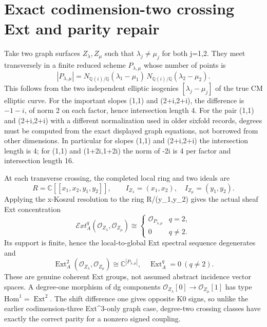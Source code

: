 \documentclass[11pt,a4paper]{article}
\newcommand{\Q}{\mathbb Q}
\newcommand{\Ext}{\operatorname{Ext}}
\begin{document}
\section{Exact codimension-two crossing Ext and parity repair}
Take two graph surfaces \(Z_\lambda,Z_\mu\) such that
\(\lambda_j\ne\mu_j\) for both j=1,2. They meet
transversely in a finite reduced scheme \(P_{\lambda,\mu}\)
whose number of points is
\[
 \boxed{|P_{\lambda,\mu}|=
  N_{\Q(i)/\Q}(\lambda_1-\mu_1)\,
  N_{\Q(i)/\Q}(\lambda_2-\mu_2).}                  \tag{3.1}
\]
This follows from the two independent elliptic isogenies
\([\lambda_j-\mu_j]\) of the true CM elliptic curve.
For the important slopes (1,1) and
(2+i,2+i), the difference is \(-1-i\),
of norm 2 on each factor, hence intersection length 4.
For the pair (1,1) and (2+i,2+i) with a different
normalization used in older sixfold records,
degrees must be computed from the exact displayed
graph equations, not borrowed from other dimensions.
In particular for slopes (1,1) and (2+i,2+i)
the intersection length is 4; for (1,1) and
(1+2i,1+2i) the norm of -2i is 4 per factor
and intersection length 16.

At each transverse crossing, the completed local ring and
two ideals are
\[
 R=\mathbb C[[x_1,x_2,y_1,y_2]],\qquad
 I_{Z_\lambda}=(x_1,x_2),\quad
 I_{Z_\mu}=(y_1,y_2).
\]
Applying the x-Koszul resolution to the ring R/(y_1,y_2)
gives the actual sheaf Ext concentration
\[
 \mathcal Ext^q_A(\mathcal O_{Z_\lambda},
                   \mathcal O_{Z_\mu})
 \cong
 \begin{cases}\mathcal O_{P_{\lambda,\mu}}&q=2,\\
                 0&q\ne2.\end{cases}               \tag{3.2}
\]
Its support is finite, hence the local-to-global Ext spectral
sequence degenerates and
\[
 \boxed{\Ext_A^2(\mathcal O_{Z_\lambda},
                 \mathcal O_{Z_\mu})
         \cong \mathbb C^{|P_{\lambda,\mu}|},\quad
         \Ext_A^q=0\ (q\ne2).}                     \tag{3.3}
\]
These are genuine coherent Ext groups, not assumed
abstract incidence vector spaces.
A degree-one morphism of dg components
\(\mathcal O_{Z_\lambda}[0]\to
   \mathcal O_{Z_\mu}[1]\)
has type
\(\mathrm{Hom}^1=\Ext^2\).
The shift difference one gives opposite K0 signs, so unlike
the earlier codimension-three Ext^3-only graph case,
degree-two crossing classes have exactly the
correct parity for a nonzero signed coupling.
\end{document}
